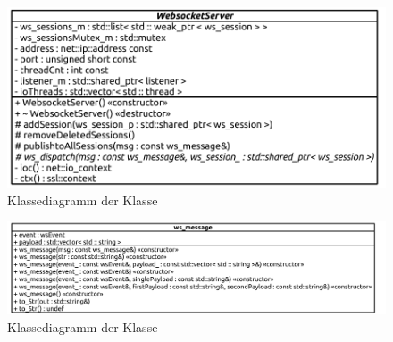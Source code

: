 \begin{figure}[ht]
  \centering
  \includegraphics[width=\textwidth]{content/hauptteil/umsetzungPoC/backend/uml/classesOfOverview/WebsocketServer.pdf}
  \caption{Klassediagramm der Klasse }
  \label{fig:backend:classDiag:WebsocketServer}
\end{figure}
\begin{figure}[ht]
  \centering
  \includegraphics[width=\textwidth]{content/hauptteil/umsetzungPoC/backend/uml/classesOfOverview/ws_message.pdf}
  \caption{Klassediagramm der Klasse }
  \label{fig:backend:classDiag:wsMsg}
\end{figure}
